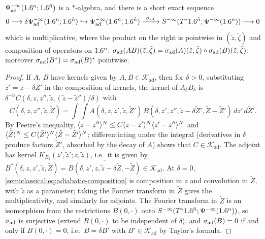 \begin{proposition}\label{semiclassical:prop:adiabatic}
  $\Psi^{-\infty}_{\mathrm{ad}}(1.6^n;1.6^{\tilde n})$ is a $*$-algebra, and there is a short exact sequence
  \begin{equation*}
    0\longrightarrow\delta\Psi^{-\infty}_{\mathrm{ad}}(1.6^n;1.6^{\tilde n})\hookrightarrow\Psi^{-\infty}_{\mathrm{ad}}(1.6^n;1.6^{\tilde n})
    \xrightarrow{\ \sigma_{\mathrm{ad}}\ }S^{-\infty}(T^*1.6^{\tilde n};\Psi^{-\infty}(1.6^n))\longrightarrow0
  \end{equation*}
  which is multiplicative, where the product on the right is pointwise in
  $(\tilde z,\tilde\zeta)$ and composition of operators on $1.6^n$:
  $\sigma_{\mathrm{ad}}(AB)(\tilde z,\tilde\zeta)=\sigma_{\mathrm{ad}}(A)(\tilde z,\tilde\zeta)\circ\sigma_{\mathrm{ad}}(B)(\tilde z,\tilde\zeta)$;
  moreover $\sigma_{\mathrm{ad}}(B^*)=\sigma_{\mathrm{ad}}(B)^*$ pointwise.
\end{proposition}
\begin{proof}
  If $A$, $B$ have kernels given by $A,B\in\mathcal K_{\mathrm{ad}}$, then for $\delta>0$,
  substituting $\tilde z'=\tilde z-\delta\tilde Z'$ in the composition of kernels, the kernel
  of $A_\delta B_\delta$ is $\delta^{-\tilde n}C(\delta,z,z'',\tilde z,(\tilde z-\tilde z'')/\delta)$
  with
  \begin{equation}\label{semiclassical:eq:adiabatic-composition}
    C(\delta,z,z'',\tilde z,\tilde Z)=\int\!\!\int A(\delta,z,z',\tilde z,\tilde Z')\,
    B(\delta,z',z'',\tilde z-\delta\tilde Z',\tilde Z-\tilde Z')\,dz'\,d\tilde Z' .
  \end{equation}
  By Peetre's inequality, $\langle z-z''\rangle^N\le C\langle z-z'\rangle^N\langle z'-z''\rangle^N$ and
  $\langle \tilde Z\rangle^N\le C\langle \tilde Z'\rangle^N\langle \tilde Z-\tilde Z'\rangle^N$; differentiating under the
  integral (derivatives in $\delta$ produce factors $\tilde Z'$, absorbed by the decay of
  $A$) shows that $C\in\mathcal K_{\mathrm{ad}}$. The adjoint has kernel
  $\overline{K_{B_\delta}(z',\tilde z';z,\tilde z)}$, i.e.\ it is given by
  $B^*(\delta,z,z',\tilde z,\tilde Z)=\overline{B(\delta,z',z,\tilde z-\delta\tilde Z,-\tilde Z)}\in\mathcal K_{\mathrm{ad}}$.
  At $\delta=0$, \eqref{semiclassical:eq:adiabatic-composition} is composition in $z$ and
  convolution in $\tilde Z$, with $\tilde z$ as a parameter; taking the Fourier transform in
  $\tilde Z$ gives the multiplicativity, and similarly for adjoints. The Fourier transform
  in $\tilde Z$ is an isomorphism from the restrictions $B(0,\cdot)$ onto
  $S^{-\infty}(T^*1.6^{\tilde n};\Psi^{-\infty}(1.6^n))$, so $\sigma_{\mathrm{ad}}$ is surjective (extend
  $B(0,\cdot)$ to be independent of $\delta$), and $\sigma_{\mathrm{ad}}(B)=0$ if and only if
  $B(0,\cdot)=0$, i.e.\ $B=\delta B'$ with $B'\in\mathcal K_{\mathrm{ad}}$ by Taylor's formula.
\end{proof}

